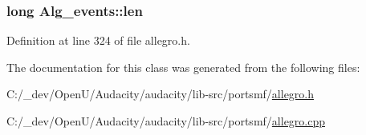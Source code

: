 \subsubsection[{\texorpdfstring{len}{len}}]{\setlength{\rightskip}{0pt plus 5cm}long Alg\+\_\+events\+::len\hspace{0.3cm}{\ttfamily [protected]}}\hypertarget{class_alg__events_ae88920e5364fb6a85ca4d47409cf1969}{}\label{class_alg__events_ae88920e5364fb6a85ca4d47409cf1969}


Definition at line 324 of file allegro.\+h.



The documentation for this class was generated from the following files\+:\begin{DoxyCompactItemize}
\item 
C\+:/\+\_\+dev/\+Open\+U/\+Audacity/audacity/lib-\/src/portsmf/\hyperlink{allegro_8h}{allegro.\+h}\item 
C\+:/\+\_\+dev/\+Open\+U/\+Audacity/audacity/lib-\/src/portsmf/\hyperlink{allegro_8cpp}{allegro.\+cpp}\end{DoxyCompactItemize}
